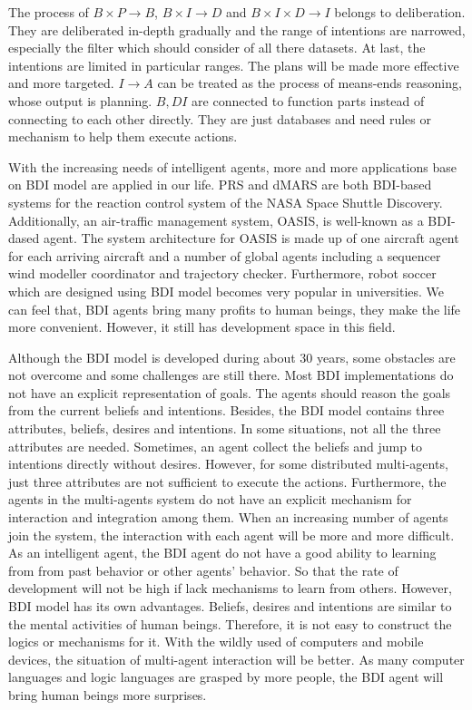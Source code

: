 The process of $B \times P \to B$, $B \times I \to D$ and $B \times I \times D \to I$ belongs to deliberation. They are deliberated in-depth gradually and the range of intentions are narrowed, especially the filter which should consider of all there datasets. At last, the intentions are limited in particular ranges. The plans will be made more effective and more targeted.  $I \to A $ can be treated as the process of means-ends reasoning, whose output is planning. $B,D I$ are connected to function parts instead of connecting to each other directly. They are just databases and need rules or mechanism to help them execute actions.

With the increasing needs of intelligent agents, more and more applications base on BDI model are applied in our life. PRS and dMARS are both BDI-based systems for the reaction control system of the NASA Space Shuttle Discovery. Additionally, an air-traffic management system, OASIS, is well-known as a BDI-dased agent. The system architecture for OASIS is made up of one aircraft agent for each arriving aircraft and a number of global agents including a sequencer wind modeller coordinator and trajectory checker\cite{Rao_BDITheory_1995}. Furthermore, robot soccer which are designed using BDI model becomes very popular in universities. We can feel that, BDI agents bring many profits to human beings, they make the life more convenient. However, it still has development space in this field.

Although the BDI model is developed during about 30 years, some obstacles are not overcome and some challenges are still there. Most BDI implementations do not have an explicit representation of goals. The agents should reason the goals from the current beliefs and intentions. Besides, the BDI model contains three attributes, beliefs, desires and intentions. In some situations, not all the three attributes are needed. Sometimes, an agent collect the beliefs and jump to intentions directly without desires. However, for some distributed multi-agents, just three attributes are not sufficient to execute the actions.  Furthermore, the agents in the multi-agents system do not have an explicit mechanism for interaction and integration among them. When an increasing number of agents join the system, the interaction with each agent will be more and more difficult. As an intelligent agent, the BDI agent do not have a good ability to learning from from past behavior or other agents’ behavior. So that the rate of development will not be high if lack mechanisms to learn from others. However, BDI model has its own advantages. Beliefs, desires and intentions are similar to the mental activities of human beings. Therefore, it is not easy to construct the logics or mechanisms for it. With the wildly used of computers and mobile devices, the situation of multi-agent interaction will be better. As many computer languages and logic languages are grasped by more people, the BDI agent will bring human beings more surprises.

